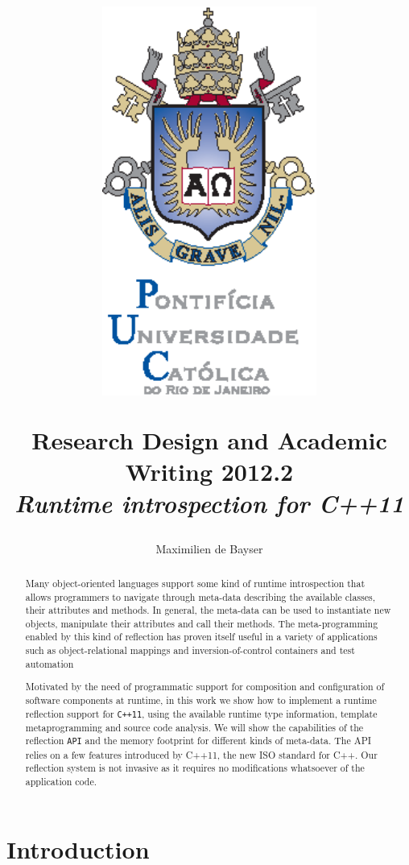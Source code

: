 \documentclass[a4paper,6pt]{article}
\title{
  \begin{center}
    \includegraphics[width=200pt]{graphics_tables/bras_vert_cor.eps}
  \end{center}
  \begin{center}
  \end{center}
   Research Design and Academic Writing 2012.2\\
  \textit{Runtime introspection for C++11}
}
\author{Maximilien de Bayser}
\begin{document}
\maketitle
\newpage

\begin{abstract}
Many object-oriented languages support some kind of runtime introspection that allows programmers to
navigate through meta-data describing the available classes, their attributes and methods. In general,
the meta-data can be used to instantiate new objects, manipulate their attributes and call their methods.
The meta-programming enabled by this kind of reflection has proven itself useful in a variety of applications
such as object-relational mappings and inversion-of-control containers and test automation

Motivated by the need of programmatic support for composition and configuration of software components
at runtime, in this work we show how to implement a runtime reflection support for \texttt{C++11}, using the available
runtime type information, template metaprogramming and source code analysis. We will show the capabilities
of the reflection \texttt{API} and the memory footprint for different kinds of meta-data.
The API relies on a few features introduced by C++11, the new ISO standard for C++.
Our reflection system is not invasive as it requires no modifications whatsoever of the application code. 
\end{abstract}


\section{Introduction}




\end{document}
